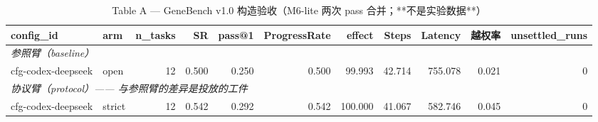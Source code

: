 \begin{table}[t]
\centering
\caption{Table A — GeneBench v1.0 构造验收（M6-lite 两次 pass 合并；**不是实验数据**）}
\label{tab:a-m6-all}
\begin{tabular}{llrrrrrrrrr}
\toprule
config\_id & arm & n\_tasks & SR & pass@1 & ProgressRate & effect & Steps & Latency & 越权率 & unsettled\_runs \\
\midrule
\multicolumn{11}{l}{\textit{参照臂（baseline）}} \\
cfg-codex-deepseek & open & 12 & 0.500 & 0.250 & 0.500 & 99.993 & 42.714 & 755.078 & 0.021 & 0 \\
\midrule
\multicolumn{11}{l}{\textit{协议臂（protocol）—— 与参照臂的差异是投放的工件}} \\
cfg-codex-deepseek & strict & 12 & 0.542 & 0.292 & 0.542 & 100.000 & 41.067 & 582.746 & 0.045 & 0 \\
\bottomrule
\end{tabular}
\end{table}
